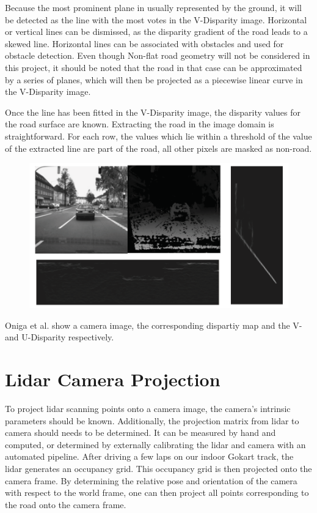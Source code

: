 \newline

Because the most prominent plane in usually represented by the ground, it will be detected as the line with the most votes in the V-Disparity image. Horizontal or vertical lines can be dismissed, as the disparity gradient of the road leads to a skewed line.
Horizontal lines can be associated with obstacles and used for obstacle detection.
Even though Non-flat road geometry will not be considered in this project, it should be noted that the road in that case can be approximated by a series of planes, which will then be projected as a piecewise linear curve in the V-Disparity image.

Once the line has been fitted in the V-Disparity image, the disparity values for the road surface are known. Extracting the road in the image domain is straightforward. For each row, the values which lie within a threshold of the value of the extracted line are part of the road, all other pixels are masked as non-road.

\begin{figure}
	\centering
	\includegraphics[width=0.7\linewidth]{Figures/vdisp}
	\caption[Overview of V-Disparity method]{}
	\label{fig:vdisp}
\end{figure}

Oniga et al. \cite{Oniga2015} show a camera image, the corresponding dispartiy map and the V- and U-Disparity respectively.



\section{Lidar Camera Projection}

To project lidar scanning points onto a camera image, the camera's intrinsic parameters should be known. Additionally, the projection matrix from lidar to camera should needs to be determined. It can be measured by hand and computed, or determined by externally calibrating the lidar and camera with an automated pipeline.
\newline
After driving a few laps on our indoor Gokart track, the lidar generates an occupancy grid. This occupancy grid is then projected onto the camera frame. By determining the relative pose and orientation of the camera with respect to the world frame, one can then project all points corresponding to the road onto the camera frame.